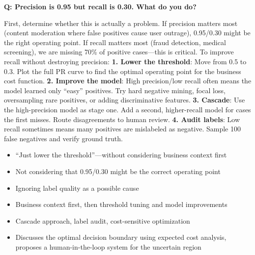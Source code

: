 \begin{interviewq}
\textbf{Q: Precision is 0.95 but recall is 0.30. What do you do?}

 \quad {} \quad \badgefreq{\freqhigh}

\stronganswer First, determine whether this is actually a problem. If precision matters most (content moderation where false positives cause user outrage), 0.95/0.30 might be the right operating point. If recall matters most (fraud detection, medical screening), we are missing 70\% of positive cases---this is critical. To improve recall without destroying precision: \textbf{1. Lower the threshold}: Move from 0.5 to 0.3. Plot the full PR curve to find the optimal operating point for the business cost function. \textbf{2. Improve the model}: High precision/low recall often means the model learned only ``easy'' positives. Try hard negative mining, focal loss, oversampling rare positives, or adding discriminative features. \textbf{3. Cascade}: Use the high-precision model as stage one. Add a second, higher-recall model for cases the first misses. Route disagreements to human review. \textbf{4. Audit labels}: Low recall sometimes means many positives are mislabeled as negative. Sample 100 false negatives and verify ground truth.

\redflags
\begin{itemize}
    \item ``Just lower the threshold''---without considering business context first
    \item Not considering that 0.95/0.30 might be the correct operating point
    \item Ignoring label quality as a possible cause
\end{itemize}


\goodgreat
\begin{itemize}
    \item {} Business context first, then threshold tuning and model improvements
    \item {} Cascade approach, label audit, cost-sensitive optimization
    \item {} Discusses the optimal decision boundary using expected cost analysis, proposes a human-in-the-loop system for the uncertain region
\end{itemize}

\end{interviewq}

